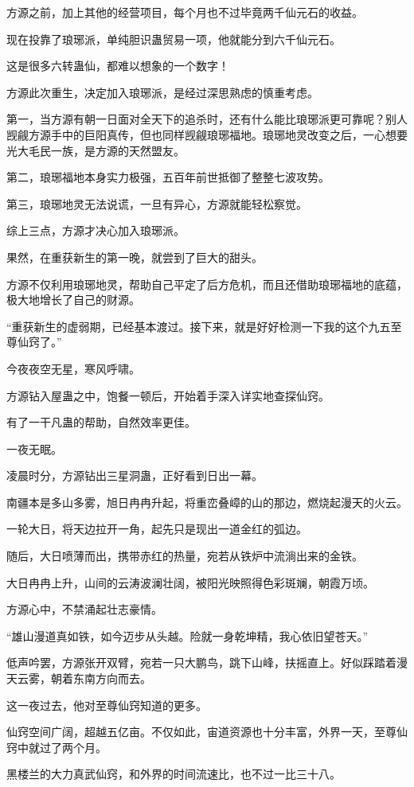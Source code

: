 \begin{this_body}
方源之前，加上其他的经营项目，每个月也不过毕竟两千仙元石的收益。

现在投靠了琅琊派，单纯胆识蛊贸易一项，他就能分到六千仙元石。

这是很多六转蛊仙，都难以想象的一个数字！

方源此次重生，决定加入琅琊派，是经过深思熟虑的慎重考虑。

第一，当方源有朝一日面对全天下的追杀时，还有什么能比琅琊派更可靠呢？别人觊觎方源手中的巨阳真传，但也同样觊觎琅琊福地。琅琊地灵改变之后，一心想要光大毛民一族，是方源的天然盟友。

第二，琅琊福地本身实力极强，五百年前世抵御了整整七波攻势。

第三，琅琊地灵无法说谎，一旦有异心，方源就能轻松察觉。

综上三点，方源才决心加入琅琊派。

果然，在重获新生的第一晚，就尝到了巨大的甜头。

方源不仅利用琅琊地灵，帮助自己平定了后方危机，而且还借助琅琊福地的底蕴，极大地增长了自己的财源。

“重获新生的虚弱期，已经基本渡过。接下来，就是好好检测一下我的这个九五至尊仙窍了。”

今夜夜空无星，寒风呼啸。

方源钻入屋蛊之中，饱餐一顿后，开始着手深入详实地查探仙窍。

有了一干凡蛊的帮助，自然效率更佳。

一夜无眠。

凌晨时分，方源钻出三星洞蛊，正好看到日出一幕。

南疆本是多山多雾，旭日冉冉升起，将重峦叠嶂的山的那边，燃烧起漫天的火云。

一轮大日，将天边拉开一角，起先只是现出一道金红的弧边。

随后，大日喷薄而出，携带赤红的热量，宛若从铁炉中流淌出来的金铁。

大日冉冉上升，山间的云涛波澜壮阔，被阳光映照得色彩斑斓，朝霞万顷。

方源心中，不禁涌起壮志豪情。

“雄山漫道真如铁，如今迈步从头越。险就一身乾坤精，我心依旧望苍天。”

低声吟罢，方源张开双臂，宛若一只大鹏鸟，跳下山峰，扶摇直上。好似踩踏着漫天云雾，朝着东南方向而去。

这一夜过去，他对至尊仙窍知道的更多。

仙窍空间广阔，超越五亿亩。不仅如此，宙道资源也十分丰富，外界一天，至尊仙窍中就过了两个月。

黑楼兰的大力真武仙窍，和外界的时间流速比，也不过一比三十八。


\end{this_body}
